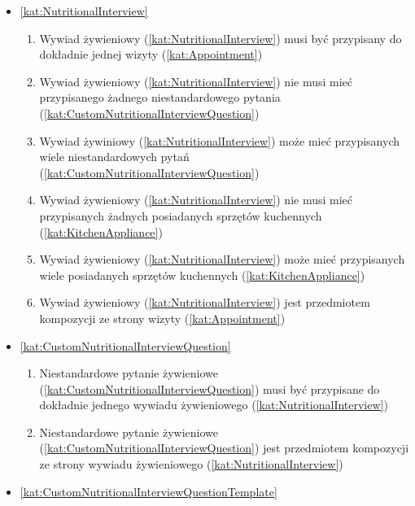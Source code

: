 \begin{itemize}[label={\textbf{Reguły dla}}, wide, labelwidth=!, labelindent=0pt]
\begin{enumerate}[label={\textbf{REG/\protect\threedigits{\arabic{enumi}}}}, wide, labelwidth=!, align=left, leftmargin=3cm, resume]
    \end{enumerate}
    \item\ref{kat:NutritionalInterview}
    \begin{enumerate}[label={\textbf{REG/\protect\threedigits{\arabic{enumi}}}}, wide, labelwidth=!, align=left, leftmargin=3cm, resume]
        \item Wywiad żywieniowy (\ref{kat:NutritionalInterview}) musi być przypisany do dokładnie jednej wizyty (\ref{kat:Appointment})
        \item Wywiad żywieniowy (\ref{kat:NutritionalInterview}) nie musi mieć przypisanego żadnego niestandardowego pytania (\ref{kat:CustomNutritionalInterviewQuestion})
        \item Wywiad żywiniowy (\ref{kat:NutritionalInterview}) może mieć przypisanych wiele niestandardowych pytań (\ref{kat:CustomNutritionalInterviewQuestion})
        \item Wywiad żywieniowy (\ref{kat:NutritionalInterview}) nie musi mieć przypisanych żadnych posiadanych sprzętów kuchennych (\ref{kat:KitchenAppliance})
        \item Wywiad żywieniowy (\ref{kat:NutritionalInterview}) może mieć przypisanych wiele posiadanych sprzętów kuchennych (\ref{kat:KitchenAppliance})
        \item Wywiad żywieniowy (\ref{kat:NutritionalInterview}) jest przedmiotem kompozycji ze strony wizyty (\ref{kat:Appointment})
    \end{enumerate}
    \item\ref{kat:CustomNutritionalInterviewQuestion}
    \begin{enumerate}[label={\textbf{REG/\protect\threedigits{\arabic{enumi}}}}, wide, labelwidth=!, align=left, leftmargin=3cm, resume]
        \item Niestandardowe pytanie żywieniowe (\ref{kat:CustomNutritionalInterviewQuestion}) musi być przypisane do dokładnie jednego wywiadu żywieniowego (\ref{kat:NutritionalInterview})
        \item  Niestandardowe pytanie żywieniowe (\ref{kat:CustomNutritionalInterviewQuestion}) jest przedmiotem kompozycji ze strony wywiadu żywieniowego (\ref{kat:NutritionalInterview})
    \end{enumerate}
    \item\ref{kat:CustomNutritionalInterviewQuestionTemplate}
    \begin{enumerate}[label={\textbf{REG/\protect\threedigits{\arabic{enumi}}}}, wide, labelwidth=!, align=left, leftmargin=3cm, resume]

\end{enumerate}
\end{itemize}
